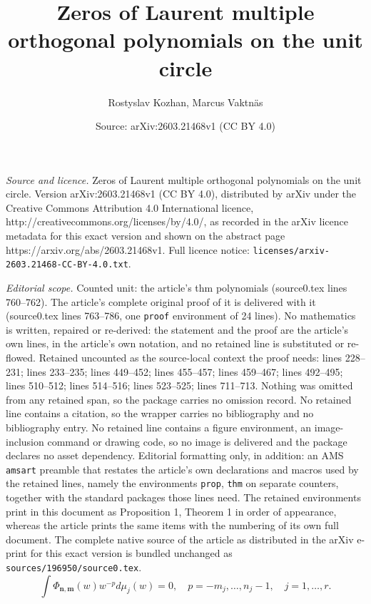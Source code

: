 \documentclass[10pt,a4paper]{amsart}
\title{Zeros of Laurent multiple orthogonal polynomials on the unit circle}
\author{Rostyslav Kozhan, Marcus Vaktn\"as}
\date{Source: arXiv:2603.21468v1 (CC BY 4.0)}
\begin{document}
\maketitle

\noindent\emph{Source and licence.} Zeros of Laurent multiple orthogonal polynomials on the unit circle. Version arXiv:2603.21468v1 (CC BY 4.0), distributed by arXiv under the Creative Commons Attribution 4.0 International licence, http://creativecommons.org/licenses/by/4.0/, as recorded in the arXiv licence metadata for this exact version and shown on the abstract page https://arxiv.org/abs/2603.21468v1. Full licence notice: \texttt{licenses/arxiv-2603.21468-CC-BY-4.0.txt}.\par\smallskip

\noindent\textit{Editorial scope.} Counted unit: the article's thm polynomials (source0.tex lines 760--762). The article's complete original proof of it is delivered with it (source0.tex lines 763--786, one \texttt{proof} environment of 24 lines). No mathematics is written, repaired or re-derived: the statement and the proof are the article's own lines, in the article's own notation, and no retained line is substituted or re-flowed.  Retained uncounted as the source-local context the proof needs: lines 228--231; lines 233--235; lines 449--452; lines 455--457; lines 459--467; lines 492--495; lines 510--512; lines 514--516; lines 523--525; lines 711--713.  Nothing was omitted from any retained span, so the package carries no omission record.  No retained line contains a citation, so the wrapper carries no bibliography and no bibliography entry.  No retained line contains a figure environment, an image-inclusion command or drawing code, so no image is delivered and the package declares no asset dependency.  Editorial formatting only, in addition: an AMS \texttt{amsart} preamble that restates the article's own declarations and macros used by the retained lines, namely the environments \texttt{prop}, \texttt{thm} on separate counters, together with the standard packages those lines need.  The retained environments print in this document as Proposition 1, Theorem 1 in order of appearance, whereas the article prints the same items with the numbering of its own full document.  The complete native source of the article as distributed in the arXiv e-print for this exact version is bundled unchanged as \texttt{sources/196950/source0.tex}.
    \begin{equation}
\label{eq:generalized hermite pade orthogonality intro}
    \int \Phi_{\bm{n},\bm{m}}(w)w^{-p}d\mu_j(w) = 0, \quad p = -m_j,\dots,n_j-1, \quad j = 1,\dots,r.
\end{equation}
\end{document}
